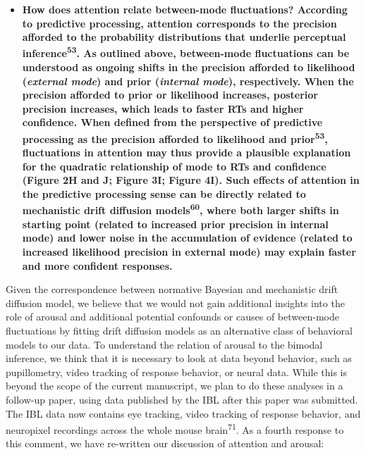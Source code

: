 \documentclass[
]{article}
\providecommand{\tightlist}{%
  \setlength{\itemsep}{0pt}\setlength{\parskip}{0pt}}
\begin{document}
\begin{itemize}
\tightlist
\item
  \textbf{How does attention relate between-mode fluctuations? According
  to predictive processing, attention corresponds to the precision
  afforded to the probability distributions that underlie perceptual
  inference\textsuperscript{53}. As outlined above, between-mode
  fluctuations can be understood as ongoing shifts in the precision
  afforded to likelihood (\emph{external mode}) and prior
  (\emph{internal mode}), respectively. When the precision afforded to
  prior or likelihood increases, posterior precision increases, which
  leads to faster RTs and higher confidence. When defined from the
  perspective of predictive processing as the precision afforded to
  likelihood and prior\textsuperscript{53}, fluctuations in attention
  may thus provide a plausible explanation for the quadratic
  relationship of mode to RTs and confidence (Figure 2H and J; Figure
  3I; Figure 4I). Such effects of attention in the predictive processing
  sense can be directly related to mechanistic drift diffusion
  models\textsuperscript{60}, where both larger shifts in starting point
  (related to increased prior precision in internal mode) and lower
  noise in the accumulation of evidence (related to increased likelihood
  precision in external mode) may explain faster and more confident
  responses.}
\end{itemize}

Given the correspondence between normative Bayesian and mechanistic
drift diffusion model, we believe that we would not gain additional
insights into the role of arousal and additional potential confounds or
causes of between-mode fluctuations by fitting drift diffusion models as
an alternative class of behavioral models to our data. To understand the
relation of arousal to the bimodal inference, we think that it is
necessary to look at data beyond behavior, such as pupillometry, video
tracking of response behavior, or neural data. While this is beyond the
scope of the current manuscript, we plan to do these analyses in a
follow-up paper, using data published by the IBL after this paper was
submitted. The IBL data now contains eye tracking, video tracking of
response behavior, and neuropixel recordings across the whole mouse
brain\textsuperscript{71}. As a fourth response to this comment, we have
re-written our discussion of attention and arousal:
\end{document}
